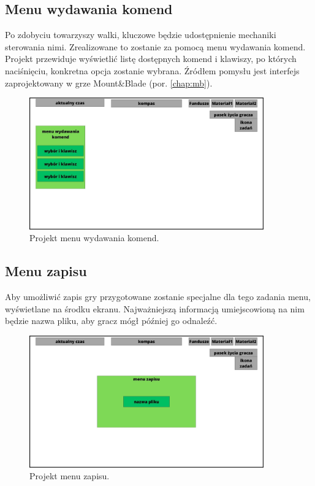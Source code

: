 \subsection{Menu wydawania komend}
Po zdobyciu towarzyszy walki, kluczowe będzie udostępnienie mechaniki sterowania nimi. Zrealizowane to zostanie za pomocą menu wydawania komend.
Projekt przewiduje wyświetlić listę dostępnych komend i klawiszy, po których naciśnięciu, konkretna opcja zostanie wybrana. 
Źródłem pomysłu jest interfejs zaprojektowany w grze Mount\&Blade (por. \ref{chap:mb}).

\begin{figure}[htbp]
    \centering
    \includegraphics[width=0.9\textwidth]{images/ui/ui_proj_walka.jpg}
    \caption{Projekt menu wydawania komend.}\label{fig:cmd_menu}
\end{figure}

\subsection{Menu zapisu}
Aby umożliwić zapis gry przygotowane zostanie specjalne dla tego zadania menu, wyświetlane na środku ekranu. Najważniejszą informacją 
umiejscowioną na nim będzie nazwa pliku, aby gracz mógł później go odnaleźć.
\begin{figure}[htbp]
    \centering
    \includegraphics[width=0.9\textwidth]{images/ui/ui_proj_zapis.jpg}
    \caption{Projekt menu zapisu.}\label{fig:men_zap}
\end{figure}

